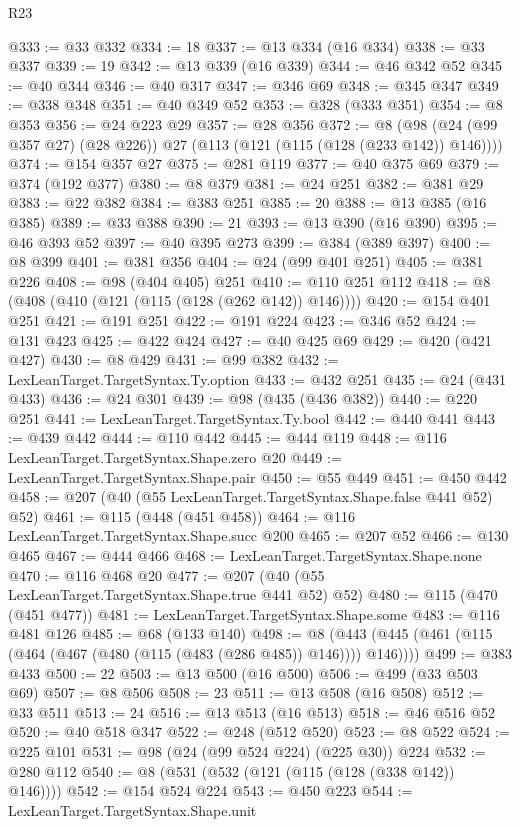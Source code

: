 \begin{lexlean}{R23}
\begin{coremodule}
@333 := @33 @332
@334 := 18
@337 := @13 @334 (@16 @334)
@338 := @33 @337
@339 := 19
@342 := @13 @339 (@16 @339)
@344 := @46 @342 @52
@345 := @40 @344
@346 := @40 @317
@347 := @346 @69
@348 := @345 @347
@349 := @338 @348
@351 := @40 @349 @52
@353 := @328 (@333 @351)
@354 := @8 @353
@356 := @24 @223 @29
@357 := @28 @356
@372 := @8 (@98 (@24 (@99 @357 @27) (@28 @226)) @27 (@113 (@121 (@115 (@128 (@233 @142)) @146))))
@374 := @154 @357 @27
@375 := @281 @119
@377 := @40 @375 @69
@379 := @374 (@192 @377)
@380 := @8 @379
@381 := @24 @251
@382 := @381 @29
@383 := @22 @382
@384 := @383 @251
@385 := 20
@388 := @13 @385 (@16 @385)
@389 := @33 @388
@390 := 21
@393 := @13 @390 (@16 @390)
@395 := @46 @393 @52
@397 := @40 @395 @273
@399 := @384 (@389 @397)
@400 := @8 @399
@401 := @381 @356
@404 := @24 (@99 @401 @251)
@405 := @381 @226
@408 := @98 (@404 @405) @251
@410 := @110 @251 @112
@418 := @8 (@408 (@410 (@121 (@115 (@128 (@262 @142)) @146))))
@420 := @154 @401 @251
@421 := @191 @251
@422 := @191 @224
@423 := @346 @52
@424 := @131 @423
@425 := @422 @424
@427 := @40 @425 @69
@429 := @420 (@421 @427)
@430 := @8 @429
@431 := @99 @382
@432 := LexLeanTarget.TargetSyntax.Ty.option
@433 := @432 @251
@435 := @24 (@431 @433)
@436 := @24 @301
@439 := @98 (@435 (@436 @382))
@440 := @220 @251
@441 := LexLeanTarget.TargetSyntax.Ty.bool
@442 := @440 @441
@443 := @439 @442
@444 := @110 @442
@445 := @444 @119
@448 := @116 LexLeanTarget.TargetSyntax.Shape.zero @20
@449 := LexLeanTarget.TargetSyntax.Shape.pair
@450 := @55 @449
@451 := @450 @442
@458 := @207 (@40 (@55 LexLeanTarget.TargetSyntax.Shape.false @441 @52) @52)
@461 := @115 (@448 (@451 @458))
@464 := @116 LexLeanTarget.TargetSyntax.Shape.succ @200
@465 := @207 @52
@466 := @130 @465
@467 := @444 @466
@468 := LexLeanTarget.TargetSyntax.Shape.none
@470 := @116 @468 @20
@477 := @207 (@40 (@55 LexLeanTarget.TargetSyntax.Shape.true @441 @52) @52)
@480 := @115 (@470 (@451 @477))
@481 := LexLeanTarget.TargetSyntax.Shape.some
@483 := @116 @481 @126
@485 := @68 (@133 @140)
@498 := @8 (@443 (@445 (@461 (@115 (@464 (@467 (@480 (@115 (@483 (@286 @485)) @146)))) @146))))
@499 := @383 @433
@500 := 22
@503 := @13 @500 (@16 @500)
@506 := @499 (@33 @503 @69)
@507 := @8 @506
@508 := 23
@511 := @13 @508 (@16 @508)
@512 := @33 @511
@513 := 24
@516 := @13 @513 (@16 @513)
@518 := @46 @516 @52
@520 := @40 @518 @347
@522 := @248 (@512 @520)
@523 := @8 @522
@524 := @225 @101
@531 := @98 (@24 (@99 @524 @224) (@225 @30)) @224
@532 := @280 @112
@540 := @8 (@531 (@532 (@121 (@115 (@128 (@338 @142)) @146))))
@542 := @154 @524 @224
@543 := @450 @223
@544 := LexLeanTarget.TargetSyntax.Shape.unit

\end{coremodule}
\end{lexlean}
